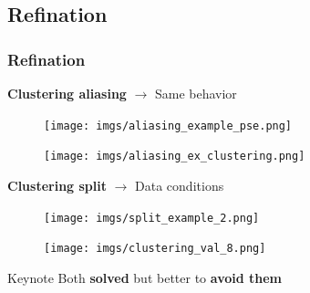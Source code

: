 \documentclass{beamer}
\begin{document}

\subsection{Refination}

\begin{frame}
	\frametitle{Refination}
\textbf{Clustering aliasing} $\rightarrow$ Same behavior
	\begin{multicols}{2}
		\begin{figure}
			\texttt{[image: imgs/aliasing\_example\_pse.png]}
		\end{figure}
		\columnbreak
		\begin{figure}
			\texttt{[image: imgs/aliasing\_ex\_clustering.png]}
		\end{figure}
	\end{multicols}
\vfill
\pause
\textbf{Clustering split} $\rightarrow$ Data conditions
	\begin{multicols}{2}
		\begin{figure}
			\texttt{[image: imgs/split\_example\_2.png]}
		\end{figure}
		\columnbreak
		\begin{figure}
			\texttt{[image: imgs/clustering\_val\_8.png]}
		\end{figure}
	\end{multicols}
\pause
\begin{block}{Keynote}
	Both \textbf{solved} but better to \textbf{avoid them}
\end{block}
\end{frame}
\end{document}
